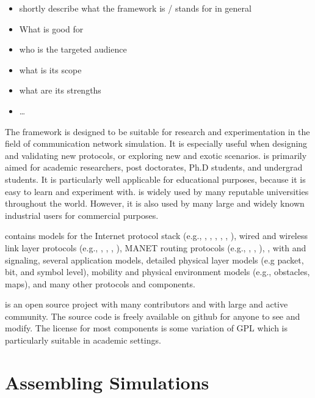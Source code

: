 \begin{itemize}
	\item	shortly describe what the \inet framework is / stands for in general
	\item	What is \inet good for
	\item	who is the targeted audience
	\item	what is its scope
	\item	what are its strengths
	\item	\ldots
\end{itemize}

The \inet framework is designed to be suitable for research and experimentation in the field of communication network simulation. It is especially useful when designing and validating new protocols, or exploring new and exotic scenarios. \inet is primarily aimed for academic researchers, post doctorates, Ph.D students, and undergrad students. It is particularly well applicable for educational purposes, because it is easy to learn and experiment with. \inet is widely used by many reputable universities throughout the world. However, it is also used by many large and widely known industrial users for commercial purposes.

\inet contains models for the Internet protocol stack (e.g., , , , , , ), wired and wireless link layer protocols (e.g., , , , ), MANET routing protocols (e.g., , , ), ,  with  and  signaling, several application models, detailed physical layer models (e.g packet, bit, and symbol level), mobility and physical environment models (e.g., obstacles, maps), and many other protocols and components.

\inet is an open source project with many contributors and with large and active community. The source code is freely available on github for anyone to see and modify. The license for most components is some variation of GPL which is particularly suitable in academic settings.

\section{Assembling Simulations}
\label{sec:assembling-simulations}

